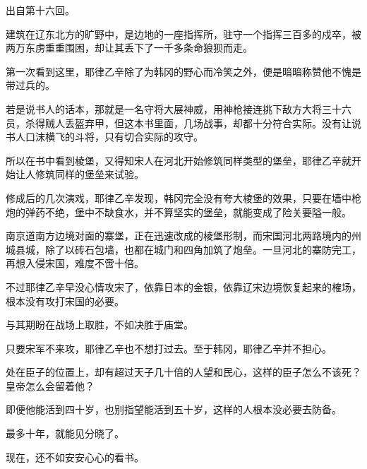 出自第十六回。

建筑在辽东北方的旷野中，是边地的一座指挥所，驻守一个指挥三百多的戍卒，被两万东虏重重围困，却让其丢下了一千多条命狼狈而走。

第一次看到这里，耶律乙辛除了为韩冈的野心而冷笑之外，便是暗暗称赞他不愧是带过兵的。

若是说书人的话本，那就是一名守将大展神威，用神枪接连挑下敌方大将三十六员，杀得贼人丢盔弃甲，但这本书里面，几场战事，却都十分符合实际。没有让说书人口沫横飞的斗将，只有切合实际的攻守。

所以在书中看到棱堡，又得知宋人在河北开始修筑同样类型的堡垒，耶律乙辛就开始让人修筑同样的堡垒来试验。

修成后的几次演戏，耶律乙辛发现，韩冈完全没有夸大棱堡的效果，只要在墙中枪炮的弹药不绝，堡中不缺食水，并不算坚实的堡垒，就能变成了险关要隘一般。

南京道南方边境对面的寨堡，正在迅速改成的棱堡形制，而宋国河北两路境内的州城县城，除了以砖石包墙，也都在城门和四角加筑了炮垒。一旦河北的寨防完工，再想入侵宋国，难度不啻十倍。

不过耶律乙辛早没心情攻宋了，依靠日本的金银，依靠辽宋边境恢复起来的榷场，根本没有攻打宋国的必要。

与其期盼在战场上取胜，不如决胜于庙堂。

只要宋军不来攻，耶律乙辛也不想打过去。至于韩冈，耶律乙辛并不担心。

处在臣子的位置上，却有超过天子几十倍的人望和民心，这样的臣子怎么不该死？皇帝怎么会留着他？

即便他能活到四十岁，也别指望能活到五十岁，这样的人根本没必要去防备。

最多十年，就能见分晓了。

现在，还不如安安心心的看书。

